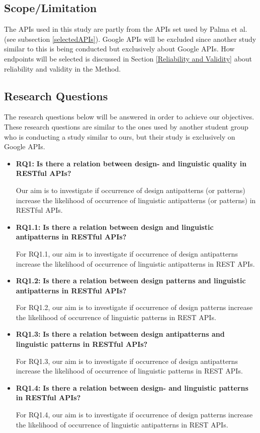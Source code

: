 \subsection{Scope/Limitation}
The APIs used in this study are partly from the APIs set used by Palma et al. \cite{linguistic} (see subsection \ref{selectedAPIs}). Google APIs will be excluded since another study similar to this is being conducted but exclusively about Google APIs. How endpoints will be selected is discussed in Section \ref{Reliability and Validity} about reliability and validity in the Method.


\subsection{Research Questions}
The research questions below will be answered in order to achieve our objectives. These research questions are similar to the ones used by another student group who is conducting a study similar to ours, but their study is exclusively on Google APIs. 

\begin{itemize}
\item \textbf{RQ1:} \textbf{Is there a relation between design- and linguistic quality in RESTful APIs?}

Our aim is to investigate if occurrence of design antipatterns (or patterns) increase the likelihood of occurrence of linguistic antipatterns (or patterns) in RESTful APIs.


\item \textbf{RQ1.1:} \textbf{Is there a relation between design and linguistic antipatterns in RESTful APIs?}

For RQ1.1, our aim is to investigate if occurrence of design antipatterns increase the likelihood of occurrence of linguistic antipatterns in REST APIs.

\item \textbf{RQ1.2:} \textbf{Is there a relation between design patterns and linguistic antipatterns in RESTful APIs?}

For RQ1.2, our aim is to investigate if occurrence of design patterns increase the likelihood of occurrence of linguistic patterns in REST APIs. 

\item  \textbf{RQ1.3:} \textbf{Is there a relation between design antipatterns and linguistic patterns in RESTful APIs?}

For RQ1.3, our aim is to investigate if occurrence of design antipatterns increase the likelihood of occurrence of linguistic patterns in REST APIs.

\item  \textbf{RQ1.4:} \textbf{Is there a relation between design- and linguistic patterns in RESTful APIs?}

For RQ1.4, our aim is to investigate if occurrence of design patterns increase the likelihood of occurrence of linguistic antipatterns in REST APIs. 

\end{itemize}

